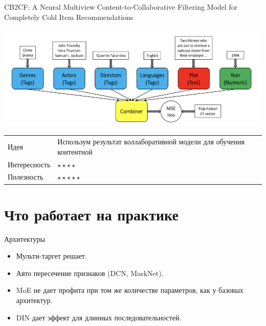 \documentclass[11pt,aspectratio=169,handout]{beamer}
\begin{document}
\begin{frame}{CB2CF: A Neural Multiview Content-to-Collaborative Filtering Model for Completely Cold Item Recommendations \cite{CB2CF}}

\begin{center}
\includegraphics[scale=0.4]{images/cf2cf.png}
\end{center}

\vfill
\begin{small}
\begin{tabular}{l l}
Идея & Использум результат коллаборативной модели для обучения контентной \\
Интересность & $\star\star\star\star$ \\
Полезность & $\star\star\star\star\star$
\end{tabular}
\end{small}

\end{frame}

\section{Что работает на практике}

\begin{frame}{Архитектуры \cite{METH}}

\begin{itemize}
\item Мульти-таргет решает.
\item Авто пересечение признаков (DCN, MaskNet).
\item MoE не дает профита при том же количестве параметров, как у базовых архитектур.
\item DIN дает эффект для длинных последовательностей.
\end{itemize}

\end{frame}
\end{document}
